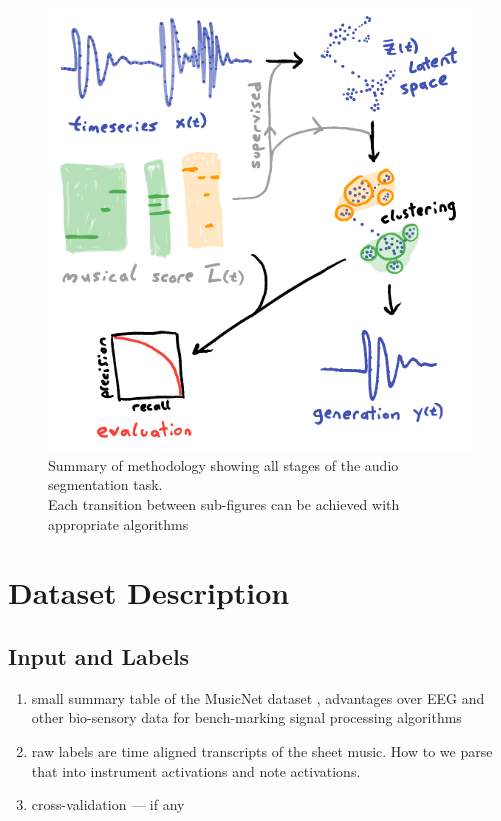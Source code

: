 \documentclass{article}[12pt]
\numberwithin{equation}{section}
\begin{document}
\begin{figure}[H]
\centering{}
\captionsetup{justification=centering}
\includegraphics[scale=0.5]{methods}
\caption{Summary of methodology showing all stages of the audio segmentation task.\\
Each transition between sub-figures can be achieved with appropriate algorithms
}
\label{fig:methods}
\end{figure}

\section{Dataset Description}

\subsection{Input and Labels}
\begin{enumerate}
	\item small summary table of the MusicNet dataset \cite{Thickstun2016}, advantages
	over EEG and other bio-sensory data for bench-marking signal processing algorithms
	\item raw labels are time aligned transcripts of the sheet music. How to we
	parse that into instrument activations and note activations.
	\item cross-validation --- if any
\end{enumerate}
\end{document}
